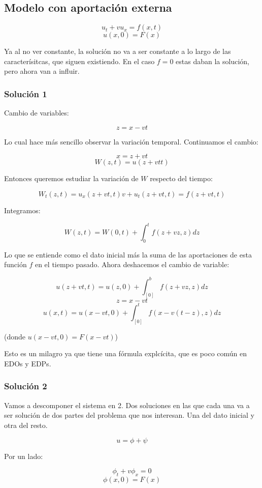 \documentclass[palatino]{apuntes}
\begin{document}
\subsection{Modelo con aportación externa}

$$u_t + vu_x = f(x,t)$$
$$u(x,0) = F(x)$$

Ya al no ver constante, la solución no va a ser constante a lo largo de las caracterísitcas, que siguen existiendo. En el caso $f = 0$ estas daban la solución, pero ahora van a influir.

\subsubsection{Solución 1}

Cambio de variables:

$$z = x-vt$$

Lo cual hace más sencillo observar la variación temporal. Continuamos el cambio:

$$x = z + vt$$
$$W(z,t) = u(z+vtt)$$

Entonces queremos estudiar la variación de $W$ respecto del tiempo:

$$W_t(z,t) = u_x(z + vt, t)v + u_t(z+vt, t) = f(z + vt, t)$$

Integramos:

$$W(z,t) = W(0,t) + \int^{t}_{0} f(z+vz, z) dz $$

Lo que se entiende como el dato inicial más la suma de las aportaciones de esta función $f$ en el tiempo pasado. Ahora deshacemos el cambio de variable:

$$u(z + vt, t) = u(z,0) + \int^{b}_[0] f(z+vz, z) dz$$
$$z = x-vt$$
$$u(x,t) = u(x-vt,0)+ \int^{t}_[0] f(x-v(t-z),z) dz$$

(donde $u(x-vt,0) = F(x-vt)$)

Esto es un milagro ya que tiene una fórmula explcícita, que es poco común en EDOs y EDPs.

\subsubsection{Solución 2}

Vamos a descomponer el sistema en 2. Dos soluciones en las que cada una va a ser solución de dos partes del problema que nos interesan. Una del dato inicial y otra del resto.

$$u = \phi + \psi$$

Por un lado:

$$\phi_t + v\phi_x = 0$$
$$\phi(x,0) = F(x) $$
\end{document}
